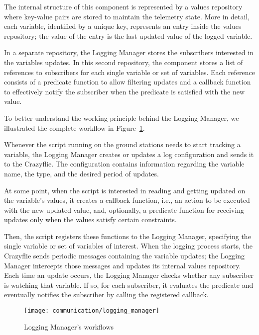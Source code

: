 The internal structure of this component is represented by a values repository where key-value pairs are stored to maintain the telemetry state.
More in detail, each variable, identified by a unique key, represents an entry inside the values repository; the value of the entry is the last updated value of the logged variable.

In a separate repository, the Logging Manager stores the subscribers interested in the variables updates. 
In this second repository, the component stores a list of references to subscribers for each single variable or set of variables. 
Each reference consists of a predicate function to allow filtering updates and a callback function to effectively notify the subscriber when the predicate is satisfied with the new value.

To better understand the working principle behind the Logging Manager, we illustrated the complete workflow in Figure~\ref{fig:logging_manager}.

Whenever the script running on the ground stations needs to start tracking a variable, the Logging Manager creates or updates a log configuration and sends it to the Crazyflie.
The configuration contains information regarding the variable name, the type, and the desired period of updates. 

At some point, when the script is interested in reading and getting updated on the variable's values, it creates a callback function, i.e., an action to be executed with the new updated value, and, optionally, a predicate function for receiving updates only when the values satisfy certain constraints.

Then, the script registers these functions to the Logging Manager, specifying the single variable or set of variables of interest.
When the logging process starts, the Crazyflie sends periodic messages containing the variable updates; the Logging Manager intercepts those messages and updates its internal values repository.
Each time an update occurs, the Logging Manager checks whether any subscriber is watching that variable. 
If so, for each subscriber, it evaluates the predicate and eventually notifies the subscriber by calling the registered callback. 

\begin{figure}[h]
    \centering
    \texttt{[image: communication/logging\_manager]}
    \caption{Logging Manager's workflows}\label{fig:logging_manager}
\end{figure}

